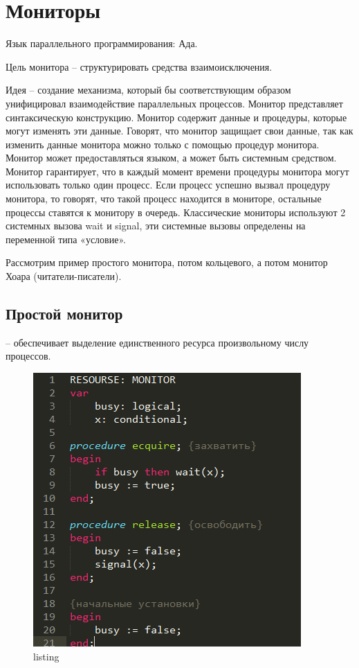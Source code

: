 \section{Мониторы}

Язык параллельного программирования: Ада. 

Цель монитора – структурировать средства взаимоисключения.

Идея – создание механизма, который бы соответствующим образом унифицировал взаимодействие параллельных процессов. Монитор представляет синтаксическую конструкцию. Монитор содержит данные и процедуры, которые могут изменять эти данные. Говорят, что монитор защищает свои данные, так как изменить данные монитора можно только с помощью процедур монитора. Монитор может предоставляться языком, а может быть системным средством. Монитор гарантирует, что в каждый момент времени процедуры монитора могут использовать только один процесс. Если процесс успешно вызвал процедуру монитора, то говорят, что такой процесс находится в мониторе, остальные процессы ставятся к монитору в очередь. Классические мониторы используют 2 системных вызова wait и signal, эти системные вызовы определены на переменной типа «условие».

Рассмотрим пример простого монитора, потом кольцевого, а потом монитор Хоара (читатели-писатели).

\subsection{Простой монитор} – обеспечивает выделение единственного ресурса произвольному числу процессов. \cite{C_Deitel2}

\begin{figure}[H]
    \centering
    \includegraphics[width=\textwidth]{listing/3.png}
    \caption{listing}
\end{figure}

